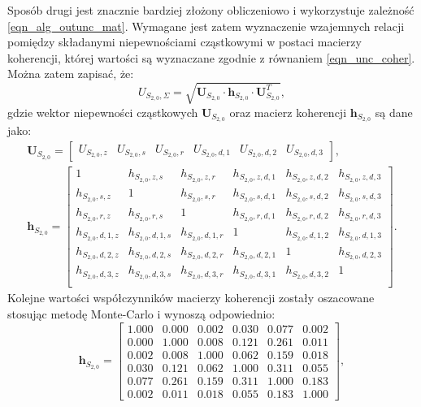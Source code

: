 Sposób drugi jest znacznie bardziej złożony obliczeniowo i wykorzystuje zależność \eqref{eqn_alg_outunc_mat}. Wymagane jest zatem wyznaczenie wzajemnych relacji pomiędzy składanymi niepewnościami cząstkowymi w postaci macierzy koherencji, której wartości są wyznaczane zgodnie z równaniem \eqref{eqn_unc_coher}. Można zatem zapisać, że:
\begin{equation}
U_{S_{2,0},\Sigma} = \sqrt{\mathbf{U}_{S_{2,0}} \cdot \mathbf{h}_{S_{2,0}} \cdot \mathbf{U}_{S_{2,0}}^{T}} \label{eqn_sym_partd_output_unc_summul_S_2_0},
\end{equation}
gdzie wektor niepewności cząstkowych $\mathbf{U}_{S_{2,0}}$ oraz macierz koherencji $\mathbf{h}_{S_{2,0}}$ są dane jako:
\begin{gather}
\mathbf{U}_{S_{2,0}} =
\begin{bmatrix}
U_{S_{2,0},z} & U_{S_{2,0},s} & U_{S_{2,0},r} & U_{S_{2,0},d,1} & U_{S_{2,0},d,2} & U_{S_{2,0},d,3}
\end{bmatrix}
\label{eqn_sym_partd_output_unc_sumuvect_S_2_0}, \\
\mathbf{h}_{S_{2,0}} =
\begin{bmatrix}
1                 & h_{S_{2,0},z,s}   & h_{S_{2,0},z,r}   & h_{S_{2,0},z,d,1} & h_{S_{2,0},z,d,2} & h_{S_{2,0},z,d,3} \\
h_{S_{2,0},s,z}   & 1                 & h_{S_{2,0},s,r}   & h_{S_{2,0},s,d,1} & h_{S_{2,0},s,d,2} & h_{S_{2,0},s,d,3} \\
h_{S_{2,0},r,z}   & h_{S_{2,0},r,s}   & 1                 & h_{S_{2,0},r,d,1} & h_{S_{2,0},r,d,2} & h_{S_{2,0},r,d,3} \\
h_{S_{2,0},d,1,z} & h_{S_{2,0},d,1,s} & h_{S_{2,0},d,1,r} & 1                 & h_{S_{2,0},d,1,2} & h_{S_{2,0},d,1,3} \\
h_{S_{2,0},d,2,z} & h_{S_{2,0},d,2,s} & h_{S_{2,0},d,2,r} & h_{S_{2,0},d,2,1} & 1                 & h_{S_{2,0},d,2,3} \\
h_{S_{2,0},d,3,z} & h_{S_{2,0},d,3,s} & h_{S_{2,0},d,3,r} & h_{S_{2,0},d,3,1} & h_{S_{2,0},d,3,2} & 1                 \\
\end{bmatrix}
\label{eqn_sym_partd_output_unc_sumcoher_S_2_0}.
\end{gather}
Kolejne wartości współczynników macierzy koherencji zostały oszacowane stosując metodę Monte-Carlo i wynoszą odpowiednio:
\begin{equation}
\mathbf{h}_{S_{2,0}} =
\begin{bmatrix}
1.000 & 0.000 & 0.002 & 0.030 & 0.077 & 0.002 \\
0.000 & 1.000 & 0.008 & 0.121 & 0.261 & 0.011 \\
0.002 & 0.008 & 1.000 & 0.062 & 0.159 & 0.018 \\
0.030 & 0.121 & 0.062 & 1.000 & 0.311 & 0.055 \\
0.077 & 0.261 & 0.159 & 0.311 & 1.000 & 0.183 \\
0.002 & 0.011 & 0.018 & 0.055 & 0.183 & 1.000
\end{bmatrix}
\label{eqn_sym_partd_output_unc_sumcoherval_S_2_0},
\end{equation}
